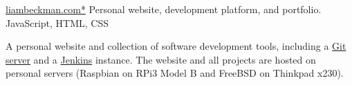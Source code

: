 \showoff
{\textcolor{my-blue}{\href{https://liambeckman.com}{liambeckman.com*}}}
{Personal website, development platform, and portfolio.}
{JavaScript, HTML, CSS}
{}


A personal website and collection of software development tools, including a \textcolor{my-blue}{\href{https://git.liambeckman.com/liam}{Git server}} and a \textcolor{my-blue}{\href{https://liambeckman.com/jenkins}{Jenkins}} instance. The website and all projects are hosted on personal servers (Raspbian on RPi3 Model B and FreeBSD on Thinkpad x230).

